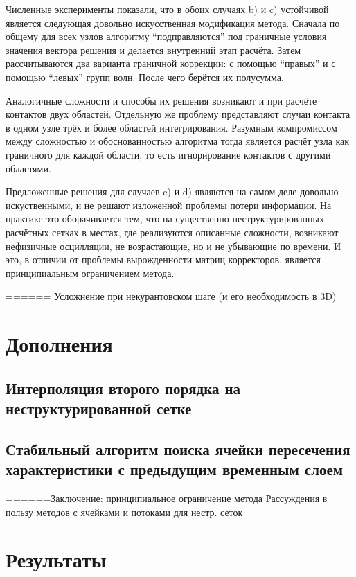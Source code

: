 Численные эксперименты показали, что в обоих случаях b) и c) устойчивой является 
следующая довольно искусственная модификация метода. 
Сначала по общему для всех узлов алгоритму ``подправляются'' под 
граничные условия значения вектора решения и делается внутренний этап расчёта. 
Затем рассчитываются два варианта граничной коррекции: с помощью ``правых'' и 
с помощью ``левых'' групп волн. После чего берётся их полусумма.

Аналогичные сложности и способы их решения возникают и при расчёте контактов двух областей. 
Отдельную же проблему представляют случаи контакта в одном узле 
трёх и более областей интегрирования. Разумным компромиссом между сложностью и 
обоснованностью алгоритма тогда является расчёт узла как граничного 
для каждой области, то есть игнорирование контактов с другими областями. 

Предложенные решения для случаев c) и d) являются на самом деле довольно искуственными, 
и не решают изложенной проблемы потери информации. На практике это оборачивается тем, 
что на существенно неструктурированных расчётных сетках в местах, где реализуются 
описанные сложности, возникают нефизичные осцилляции, не возрастающие, но и не убывающие 
по времени. И это, в отличии от проблемы вырожденности матриц корректоров, является принципиальным 
ограничением метода.


====== Усложнение при некурантовском шаге (и его необходимость в 3D)

\section{Дополнения}
\subsection{Интерполяция второго порядка на неструктурированной сетке }
\subsection{Стабильный алгоритм поиска 
ячейки пересечения характеристики с предыдущим временным слоем}

======Заключение: принципиальное ограничение метода 
Рассуждения в пользу методов с ячейками и потоками для нестр. сеток



\section{Результаты}



